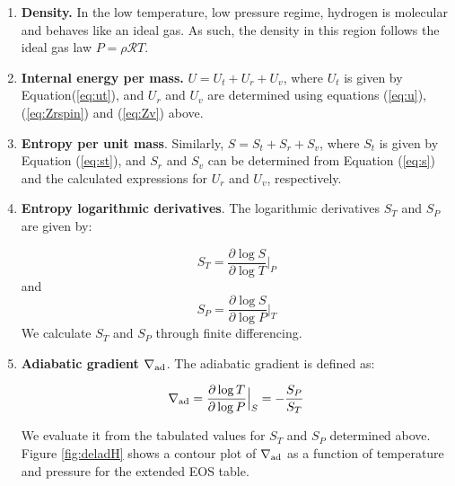 \documentclass[apj]{emulateapj}
\newcommand{\delad}{\nabla_{\rm ad}}
\begin{document}
\begin{enumerate}

\item{\textbf{Density.}} In the low temperature, low pressure regime, hydrogen is molecular and behaves like an ideal gas. As such, the density in this region follows the ideal gas law $P=\rho \mathcal{R} T$.
\item{\textbf{Internal energy per mass.}} $U=U_t+U_r+U_v$, where $U_t$ is given by Equation(\ref{eq:ut}), and $U_r$ and $U_v$ are determined using equations (\ref{eq:u}), (\ref{eq:Zrspin}) and (\ref{eq:Zv}) above.
\item{\textbf{Entropy per unit mass}}. Similarly, $S=S_t+S_r+S_v$, where $S_t$ is given by Equation (\ref{eq:st}), and $S_r$ and $S_v$ can be determined from Equation (\ref{eq:s}) and the calculated expressions for $U_r$ and $U_v$, respectively.
\item{\textbf{Entropy logarithmic derivatives}}. The logarithmic derivatives $S_T$ and $S_P$ are given by:

\begin{equation}
\label{eq:sT}
S_T=\frac{\partial \log{S}}{\partial \log{T}} \Big |_P
\end{equation}
and
\begin{equation}
\label{eq:sP}
S_P=\frac{\partial \log{S}}{\partial \log{P}} \Big |_T
\end{equation}
We calculate $S_T$ and $S_P$ through finite differencing. 

\item{\textbf{Adiabatic gradient $\delad$}}. The adiabatic gradient is defined as:

\begin{equation}
\label{eq:deladSP}
\delad=\frac{\partial \log{T}}{\partial \log{P}} \Big |_S = -\frac{S_P}{S_T}
\end{equation}

We evaluate it from the tabulated values for $S_T$ and $S_P$ determined above. Figure \ref{fig:deladH} shows a contour plot of $\delad$ as a function of temperature and pressure for the extended EOS table.    %

\end{enumerate}
\end{document}
